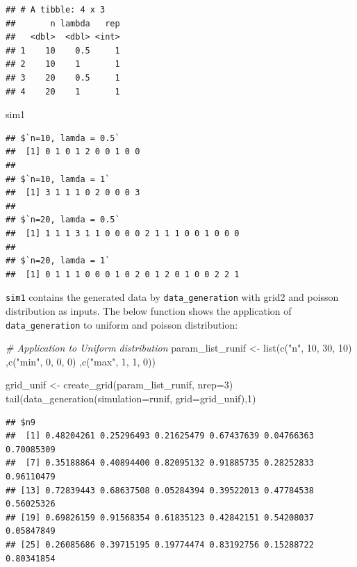 \documentclass[11pt,a4paper]{article}
\newenvironment{Shaded}{\begin{snugshade}}{\end{snugshade}}
\newcommand{\AttributeTok}[1]{\textcolor[rgb]{0.77,0.63,0.00}{#1}}
\newcommand{\CommentTok}[1]{\textcolor[rgb]{0.56,0.35,0.01}{\textit{#1}}}
\newcommand{\DecValTok}[1]{\textcolor[rgb]{0.00,0.00,0.81}{#1}}
\newcommand{\FunctionTok}[1]{\textcolor[rgb]{0.00,0.00,0.00}{#1}}
\newcommand{\NormalTok}[1]{#1}
\newcommand{\OtherTok}[1]{\textcolor[rgb]{0.56,0.35,0.01}{#1}}
\newcommand{\StringTok}[1]{\textcolor[rgb]{0.31,0.60,0.02}{#1}}
\begin{document}
\begin{verbatim}
## # A tibble: 4 x 3
##       n lambda   rep
##   <dbl>  <dbl> <int>
## 1    10    0.5     1
## 2    10    1       1
## 3    20    0.5     1
## 4    20    1       1
\end{verbatim}

\begin{Shaded}
\begin{Highlighting}[]
\NormalTok{sim1}
\end{Highlighting}
\end{Shaded}

\begin{verbatim}
## $`n=10, lamda = 0.5`
##  [1] 0 1 0 1 2 0 0 1 0 0
## 
## $`n=10, lamda = 1`
##  [1] 3 1 1 1 0 2 0 0 0 3
## 
## $`n=20, lamda = 0.5`
##  [1] 1 1 1 3 1 1 0 0 0 0 2 1 1 1 0 0 1 0 0 0
## 
## $`n=20, lamda = 1`
##  [1] 0 1 1 1 0 0 0 1 0 2 0 1 2 0 1 0 0 2 2 1
\end{verbatim}

\texttt{sim1} contains the generated data by \texttt{data\_generation}
with grid2 and poisson distribution as inputs. The below function shows
the application of \texttt{data\_generation} to uniform and poisson
distribution:

\begin{Shaded}
\begin{Highlighting}[]
\CommentTok{\# Application to Uniform distribution}
\NormalTok{param\_list\_runif }\OtherTok{\textless{}{-}} \FunctionTok{list}\NormalTok{(}\FunctionTok{c}\NormalTok{(}\StringTok{"n"}\NormalTok{, }\DecValTok{10}\NormalTok{, }\DecValTok{30}\NormalTok{, }\DecValTok{10}\NormalTok{)}
\NormalTok{                         ,}\FunctionTok{c}\NormalTok{(}\StringTok{"min"}\NormalTok{, }\DecValTok{0}\NormalTok{, }\DecValTok{0}\NormalTok{, }\DecValTok{0}\NormalTok{)}
\NormalTok{                         ,}\FunctionTok{c}\NormalTok{(}\StringTok{"max"}\NormalTok{, }\DecValTok{1}\NormalTok{, }\DecValTok{1}\NormalTok{, }\DecValTok{0}\NormalTok{))}


\NormalTok{grid\_unif }\OtherTok{\textless{}{-}} \FunctionTok{create\_grid}\NormalTok{(param\_list\_runif, }\AttributeTok{nrep=}\DecValTok{3}\NormalTok{)}
\FunctionTok{tail}\NormalTok{(}\FunctionTok{data\_generation}\NormalTok{(}\AttributeTok{simulation=}\NormalTok{runif, }\AttributeTok{grid=}\NormalTok{grid\_unif),}\DecValTok{1}\NormalTok{)}
\end{Highlighting}
\end{Shaded}

\begin{verbatim}
## $n9
##  [1] 0.48204261 0.25296493 0.21625479 0.67437639 0.04766363 0.70085309
##  [7] 0.35188864 0.40894400 0.82095132 0.91885735 0.28252833 0.96110479
## [13] 0.72839443 0.68637508 0.05284394 0.39522013 0.47784538 0.56025326
## [19] 0.69826159 0.91568354 0.61835123 0.42842151 0.54208037 0.05847849
## [25] 0.26085686 0.39715195 0.19774474 0.83192756 0.15288722 0.80341854
\end{verbatim}
\end{document}

